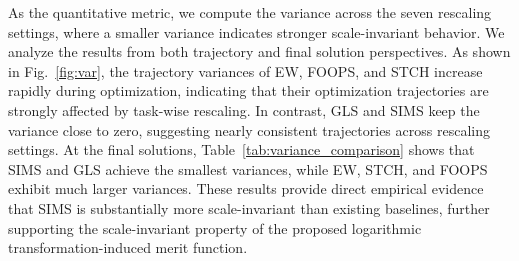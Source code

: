 \documentclass[sigconf]{acmart}
\begin{document}
\begin{add}
As the quantitative metric, we compute the variance across the seven rescaling settings, where a smaller variance indicates stronger scale-invariant behavior. We analyze the results from both trajectory and final solution perspectives. As shown in Fig.~\ref{fig:var}, the trajectory variances of EW, FOOPS, and STCH increase rapidly during optimization, indicating that their optimization trajectories are strongly affected by task-wise rescaling. In contrast, GLS and SIMS keep the variance close to zero, suggesting nearly consistent trajectories across rescaling settings. At the final solutions, Table~\ref{tab:variance_comparison} shows that SIMS and GLS achieve the smallest variances, while EW, STCH, and FOOPS exhibit much larger variances. These results provide direct empirical evidence that SIMS is substantially more scale-invariant than existing baselines, further supporting the scale-invariant property of the proposed logarithmic transformation-induced merit function.

\end{add}
\end{document}
